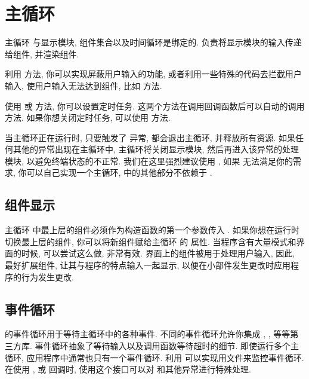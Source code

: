 \section{主循环}
主循环  与显示模块, 组件集合以及时间循环是绑定的.  负责将显示模块的输入传递给组件, 并渲染组件.

利用  方法, 你可以实现屏蔽用户输入的功能, 或者利用一些特殊的代码去拦截用户输入, 使用户输入无法达到组件, 比如  方法.

使用  或  方法, 你可以设置定时任务. 这两个方法在调用回调函数后可以自动的调用  方法. 如果你想关闭定时任务, 可以使用  方法.

当主循环正在运行时, 只要触发了  异常, 都会退出主循环, 并释放所有资源. 如果任何其他的异常出现在主循环中, 主循环将关闭显示模块, 然后再进入该异常的处理模块, 以避免终端状态的不正常. 我们在这里强烈建议使用 , 如果  无法满足你的需求, 你可以自己实现一个主循环, \urwid{} 中的其他部分不依赖于 .

\subsection{组件显示}
主循环  中最上层的组件必须作为构造函数的第一个参数传入 . 如果你想在运行时切换最上层的组件, 你可以将新组件赋给主循环  的  属性. 当程序含有大量模式和界面的时候, 可以尝试这么做, 非常有效. 界面上的组件被用于处理用户输入, 因此, 最好扩展组件, 让其与程序的特点输入一起显示, 以便在小部件发生更改时应用程序的行为发生更改.

\subsection{事件循环}
\indent\urwid{} 的事件循环用于等待主循环中的各种事件. 不同的事件循环允许你集成 , ,  等等第三方库. 事件循环抽象了等待输入以及调用函数等待超时的细节. 即使运行多个主循环, 应用程序中通常也只有一个事件循环. 利用  可以实现用文件来监控事件循环. 在使用 ,  或  回调时, 使用这个接口可以对  和其他异常进行特殊处理.

